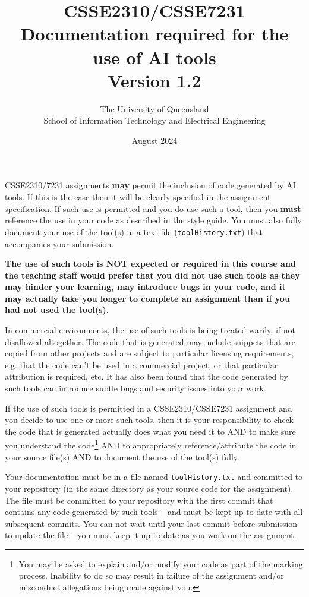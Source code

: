 \documentclass{article}
\title{CSSE2310/CSSE7231\\Documentation required for the use of AI tools\\Version 1.2}
\author{The University of Queensland\\School of Information Technology and Electrical Engineering}
\date{August 2024}
\begin{document}
\maketitle
\thispagestyle{plain}
\linenumbers

CSSE2310/7231 assignments \textbf{may} permit the inclusion of code generated by AI tools. If this is the case
then it will be clearly specified in the assignment specification. If such use is permitted and you do use such a tool, 
then you \textbf{must} reference the use in your code as described in the style guide. You must also fully document your use 
of the tool(s) in a text file (\texttt{toolHistory.txt}) that accompanies your submission.

\textbf{The use of such tools is NOT expected or required in this course and the teaching staff would prefer that you did
not use such tools as they may hinder your learning, may introduce bugs in your code, and it may actually take
you longer to complete an assignment than if you had not used the tool(s).}

In commercial environments, the use of such tools is being treated warily, if not disallowed altogether. The code that 
is generated may include snippets that are copied from other projects and are subject to particular licensing requirements, 
e.g. that the code can't be used in a commercial project, or that particular attribution is required, etc. It has also been found 
that the code generated by such tools can introduce subtle bugs and security issues into your work. 

If the use of such tools is permitted in a CSSE2310/CSSE7231 assignment and you decide to use one or more such tools, then it is your responsibility
to check the code that is generated actually does what you need it to AND to make sure you understand the code\footnote{You may be asked to explain and/or 
modify your code as part of the marking process. Inability to do so may result in failure of the assignment and/or misconduct 
allegations being made against you.} AND to appropriately reference/attribute the code in your source file(s) 
AND to document the use of the tool(s) fully.

Your documentation must be in a file named \texttt{toolHistory.txt} and committed to your repository (in the same directory as your 
source code for the assignment). The file must be committed to your repository with the first commit that contains any code generated
by such tools -- and must be kept up to date with all subsequent commits. You can not wait until your last commit before submission
to update the file -- you must keep it up to date as you work on the assignment.
\end{document}
